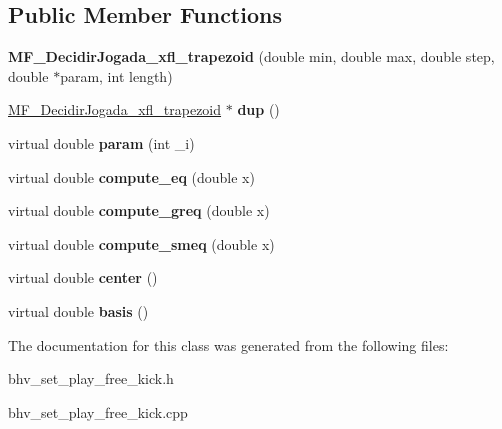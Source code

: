 \subsection*{Public Member Functions}
\begin{DoxyCompactItemize}
\item 
\hypertarget{classMF__DecidirJogada__xfl__trapezoid_a0cedc7a897f3c630fa7b87047120da30}{
{\bfseries MF\_\-DecidirJogada\_\-xfl\_\-trapezoid} (double min, double max, double step, double $\ast$param, int length)}
\label{classMF__DecidirJogada__xfl__trapezoid_a0cedc7a897f3c630fa7b87047120da30}

\item 
\hypertarget{classMF__DecidirJogada__xfl__trapezoid_a9bf085056a6794a5365d1f7e5372f262}{
\hyperlink{classMF__DecidirJogada__xfl__trapezoid}{MF\_\-DecidirJogada\_\-xfl\_\-trapezoid} $\ast$ {\bfseries dup} ()}
\label{classMF__DecidirJogada__xfl__trapezoid_a9bf085056a6794a5365d1f7e5372f262}

\item 
\hypertarget{classMF__DecidirJogada__xfl__trapezoid_a7243b3c590dc79f24fdca8bda3cc624a}{
virtual double {\bfseries param} (int \_\-i)}
\label{classMF__DecidirJogada__xfl__trapezoid_a7243b3c590dc79f24fdca8bda3cc624a}

\item 
\hypertarget{classMF__DecidirJogada__xfl__trapezoid_ae4767e07c81385ca1d09e6618929eb9b}{
virtual double {\bfseries compute\_\-eq} (double x)}
\label{classMF__DecidirJogada__xfl__trapezoid_ae4767e07c81385ca1d09e6618929eb9b}

\item 
\hypertarget{classMF__DecidirJogada__xfl__trapezoid_a5f2a25d091e9ebc923deee1820639cb8}{
virtual double {\bfseries compute\_\-greq} (double x)}
\label{classMF__DecidirJogada__xfl__trapezoid_a5f2a25d091e9ebc923deee1820639cb8}

\item 
\hypertarget{classMF__DecidirJogada__xfl__trapezoid_ac2a05118b3dff27cd8b378c9b1bf714a}{
virtual double {\bfseries compute\_\-smeq} (double x)}
\label{classMF__DecidirJogada__xfl__trapezoid_ac2a05118b3dff27cd8b378c9b1bf714a}

\item 
\hypertarget{classMF__DecidirJogada__xfl__trapezoid_a44eb06d09d76fa3dc3510bc41b930570}{
virtual double {\bfseries center} ()}
\label{classMF__DecidirJogada__xfl__trapezoid_a44eb06d09d76fa3dc3510bc41b930570}

\item 
\hypertarget{classMF__DecidirJogada__xfl__trapezoid_aba989e2c2fb8e1e5f492f265e8ca3013}{
virtual double {\bfseries basis} ()}
\label{classMF__DecidirJogada__xfl__trapezoid_aba989e2c2fb8e1e5f492f265e8ca3013}

\end{DoxyCompactItemize}


The documentation for this class was generated from the following files:\begin{DoxyCompactItemize}
\item 
bhv\_\-set\_\-play\_\-free\_\-kick.h\item 
bhv\_\-set\_\-play\_\-free\_\-kick.cpp\end{DoxyCompactItemize}

